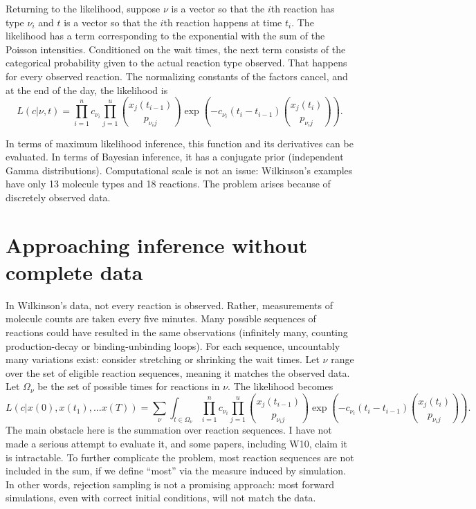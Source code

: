 \documentclass{article}
\begin{document}
Returning to the likelihood, suppose $\nu$ is a vector so that the $i$th reaction has type $\nu_i$ and $t$ is a vector so that the $i$th reaction happens at time $t_i$. The likelihood has a term corresponding to the exponential with the sum of the Poisson intensities. Conditioned on the wait times, the next term consists of the categorical probability given to the actual reaction type observed. That happens for every observed reaction. The normalizing constants of the factors cancel, and at the end of the day, the likelihood is $$L(c|\nu, t) = \prod_{i=1}^n c_{\nu_{i}} \prod_{j=1}^u {{x_{j}(t_{i-1})}\choose{p_{{\nu_{i}}j}}}\exp\left(-c_{\nu_{i}} (t_{i}-t_{i-1}) {{x_j(t_{i})}\choose{p_{{\nu_{i}}j}}}\right).$$

In terms of maximum likelihood inference, this function and its derivatives can be evaluated. In terms of Bayesian inference, it has a conjugate prior (independent Gamma distributions). Computational scale is not an issue: Wilkinson's examples have only 13 molecule types and 18 reactions. The problem arises because of discretely observed data.

\section{Approaching inference without complete data}
\label{sec:intro_em}

In Wilkinson's data, not every reaction is observed. Rather, measurements of molecule counts are taken every five minutes. Many possible sequences of reactions could have resulted in the same observations (infinitely many, counting production-decay or binding-unbinding loops). For each sequence, uncountably many variations exist: consider stretching or shrinking the wait times. Let $\nu$ range over the set of eligible reaction sequences, meaning it matches the observed data. Let $\Omega_{\nu}$ be the set of possible times for reactions in $\nu$. The likelihood becomes 
\begin{equation}\label{eqn_nasty_lik}
L(c|x(0), x(t_1), ... x(T)) =\sum_{\nu}\int_{t\in \Omega_{\nu}} \prod_{i=1}^n c_{\nu_{i}} \prod_{j=1}^u {{x_{j}(t_{i-1})}\choose{p_{{\nu_{i}}j}}}\exp\left(-c_{\nu_{i}} (t_{i}-t_{i-1}) {{x_j(t_{i})}\choose{p_{{\nu_{i}}j}}}\right).
\end{equation}
The main obstacle here is the summation over reaction sequences. I have not made a serious attempt to evaluate it, and some papers, including W10, claim it is intractable. To further complicate the problem, most reaction sequences are not included in the sum, if we define ``most'' via the measure induced by simulation. In other words, rejection sampling is not a promising approach: most forward simulations, even with correct initial conditions, will not match the data. 
\end{document}
